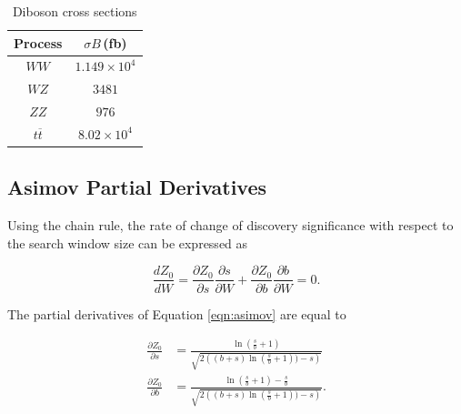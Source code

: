 \documentclass{article}
\begin{document}
\begin{table}[h!t]
\label{table:DBi}
\centering
\caption{ Diboson cross sections }
\begin{tabular}{ |c|c| } 
\hline
Process & $\sigma B\,$(fb) \\\hline
$WW$ & $1.149\times10^4$ \\\hline
$WZ$ & $3481$ \\\hline 
$ZZ$ & $976$ \\\hline
$t\overline{t}$ & $8.02\times10^4$\\\hline
\end{tabular}
\end{table}

\subsection{Asimov Partial Derivatives}

Using the chain rule, the rate of change of discovery significance with respect to the search window size can be expressed as

\begin{equation}
\frac{d Z_0}{d W} = \frac{\partial Z_0}{\partial s}\frac{\partial s}{\partial W} + \frac{\partial Z_0}{\partial b}\frac{\partial b}{\partial W} = 0.
\end{equation}

The partial derivatives of Equation \ref{eqn:asimov} are equal to

\begin{equation}
\begin{split}
\frac{\partial Z_0}{\partial s} & = \frac{\ln(\frac{s}{b}+1)}{\sqrt{2\left((b+s)\ln(\frac{s}{b}+1))-s\right)}} \\ 
\frac{\partial Z_0}{\partial b} & = \frac{\ln(\frac{s}{b}+1)-\frac{s}{b}}{\sqrt{2\left((b+s)\ln(\frac{s}{b}+1))-s\right)}}.
\end{split}
\end{equation}


\end{document}

